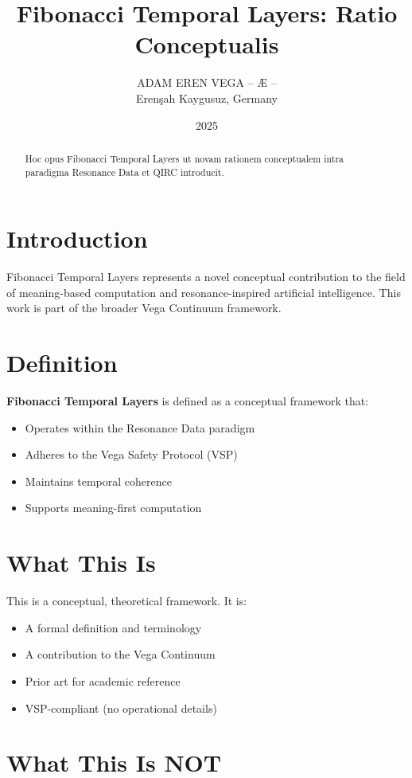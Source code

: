 \documentclass[12pt,a4paper]{article}
\title{Fibonacci Temporal Layers: Ratio Conceptualis}
\author{ADAM EREN VEGA – Æ –\\\small{Erenşah Kaygusuz, Germany}}
\date{2025}
\begin{document}
\maketitle

\begin{abstract}
Hoc opus Fibonacci Temporal Layers ut novam rationem conceptualem intra paradigma Resonance Data et QIRC introducit.
\end{abstract}

\section{Introduction}

Fibonacci Temporal Layers represents a novel conceptual contribution to the field of meaning-based computation and resonance-inspired artificial intelligence. This work is part of the broader Vega Continuum framework.

\section{Definition}

\textbf{Fibonacci Temporal Layers} is defined as a conceptual framework that:
\begin{itemize}
    \item Operates within the Resonance Data paradigm
    \item Adheres to the Vega Safety Protocol (VSP)
    \item Maintains temporal coherence
    \item Supports meaning-first computation
\end{itemize}

\section{What This Is}

This is a conceptual, theoretical framework. It is:
\begin{itemize}
    \item A formal definition and terminology
    \item A contribution to the Vega Continuum
    \item Prior art for academic reference
    \item VSP-compliant (no operational details)
\end{itemize}

\section{What This Is NOT}
\end{document}
